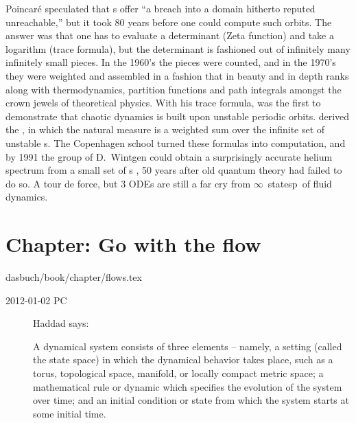 \begin{description}
Poincar\'e speculated that
\po s offer ``a breach into a domain
hitherto reputed unreachable,'' but it took 80 years before one could
compute such orbits. The answer was that one has to evaluate a
determinant (Zeta function) and take a logarithm (trace formula),
but the determinant is fashioned out of infinitely many infinitely small pieces.
In the 1960's the pieces were counted, and in the 1970's they were
weighted and assembled in a fashion that in beauty and in depth ranks
along with thermodynamics, partition functions and path integrals
amongst the crown jewels of theoretical physics.
With his trace
formula, \cite{gutbook} was the first to demonstrate that chaotic
dynamics is built upon unstable periodic orbits. \cite{ruelle}
derived the {\dzeta}, in which the natural measure is a weighted sum
over the infinite set of unstable \po s. The Copenhagen school
\citep{DasBuch} turned these formulas into computation, and by 1991
the group of D.~Wintgen could obtain a surprisingly accurate helium
spectrum from a small set of \po s \citep{ERTW91}, 50 years after old
quantum theory had failed to do so. A tour de force, but 3 ODEs are
still a far cry from $\infty$\dmn\ statesp\ of fluid dynamics.


\end{description}


\section{Chapter: Go with the flow}
\label{c-flows}\noindent dasbuch/book/chapter/flows.tex

\begin{description}

\item[2012-01-02 PC]
Haddad says:                     \toCB

A dynamical system consists of three elements -- namely, a setting (called
the state space) in which the dynamical behavior takes place, such as a
torus, topological space, manifold, or locally compact metric space; a
mathematical rule or dynamic which specifies the evolution of the system
over time; and an initial condition or state from which the system starts
at some initial time.

\end{description}


%
%


